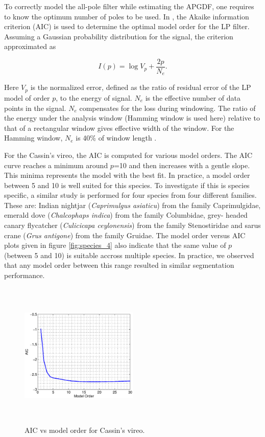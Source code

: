 \documentclass[a4paper]{article}
\begin{document}
To correctly model the all-pole filter while estimating the APGDF, one requires
to know the optimum number of poles to be used. In \cite{makhoul}, the Akaike
information criterion (AIC) is used to determine the optimal model order for the
LP filter. Assuming a Gaussian probability distribution for the signal, the
criterion approximated as

\begin{equation}
I(p)=\log V_p+\frac{2p}{N_e}. 
\end{equation}

Here $V_p$ is the normalized error, defined as the ratio of residual error of the
LP model of order $p$, to the energy of signal. $N_e$ is the effective number of data points
in the signal.  $N_e$ compensates for the loss during windowing. The ratio of
the energy under the analysis window (Hamming window is used here) relative to
that of a rectangular window gives effective width of the window. For the
Hamming window, $N_e$ is 40\% of window length \cite{makhoul}.

For the Cassin's vireo, the AIC is computed for various model orders. The AIC
curve reaches a minimum around $p$=10 and then increases with a gentle slope.
This minima represents the model with the best fit. In
practice, a model order between 5 and 10 is well suited for this species.  To
investigate if this is species specific, a similar study is performed for four
species from four different families. These are: Indian nightjar
(\textit{Caprimulgus asiaticu}) from the family Caprimulgidae, emerald dove
(\textit{Chalcophaps indica}) from the family Columbidae, grey- headed canary
flycatcher (\textit{Culicicapa ceylonensis}) from the family Stenostiridae and
sarus crane (\textit{Grus antigone}) from the family Gruidae.  The model order
versus AIC plots given in figure \ref{fig:species_4} also indicate that the same
value of $p$ (between 5 and 10) is suitable accross multiple species. In
practice, we observed that any model order between this range resulted in
similar segmentation performance.

 \begin{figure}[!ht]
	\centering
	\includegraphics[width=0.5\textwidth,height=7cm] {cassins_AIC.eps}
	\caption{AIC vs model order for Cassin's vireo.}   
	\label{fig:AIC_cassins}
\end{figure} 
\end{document}
